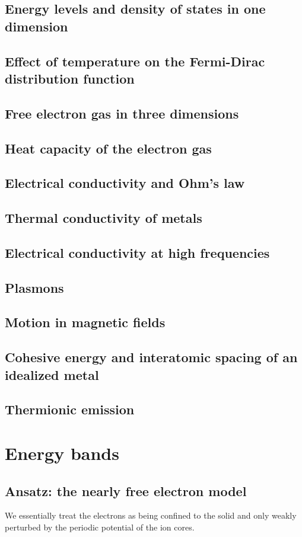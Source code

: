 \section{Energy levels and density of states in one dimension}
\section{Effect of temperature on the Fermi-Dirac distribution function}
\section{Free electron gas in three dimensions}
\section{Heat capacity of the electron gas}
\section{Electrical conductivity and Ohm's law}
\section{Thermal conductivity of metals}
\section{Electrical conductivity at high frequencies}
\section{Plasmons}
\section{Motion in magnetic fields}
\section{Cohesive energy and interatomic spacing of an idealized metal}
\section{Thermionic emission}

\chapter{Energy bands}
\section{Ansatz: the nearly free electron model}
We essentially treat the electrons as being confined to the solid and only weakly perturbed by the periodic potential of the ion cores.
